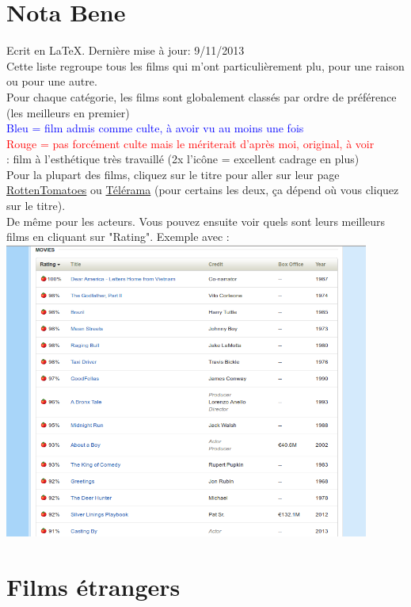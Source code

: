 
\tableofcontents

\newpage
\section*{Nota Bene}
Ecrit en \LaTeX. Dernière mise à jour: 9/11/2013  \\
Cette liste regroupe tous les films qui m'ont particulièrement plu, pour une raison ou pour une autre. \\
Pour chaque catégorie, les films sont globalement classés par ordre de préférence (les meilleurs en premier) \\
\textcolor{blue}{Bleu = film admis comme culte, à avoir vu au moins une fois} \\
\textcolor{red}{Rouge = pas forcément culte mais le mériterait d'après moi, original, à voir}\\
\beau : film à l'esthétique très travaillé (2x l’icône =  excellent cadrage en plus) \\
Pour la plupart des films, cliquez sur le titre pour aller sur leur page \href{https://www.rottentomatoes.com/}{RottenTomatoes} ou \href{http://www.telerama.fr/}{Télérama} (pour certains les deux, ça dépend où vous cliquez sur le titre). \\
De même pour les acteurs. Vous pouvez ensuite voir quels sont leurs meilleurs films en cliquant sur "Rating". Exemple avec \RobertDeNiro: \\

\includegraphics[width=0.9\textwidth]{divers/exemple1.png} 

\newpage
\section{Films étrangers}

